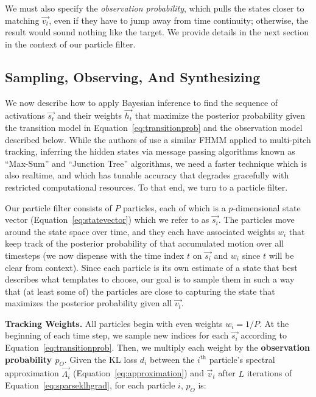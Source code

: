 \documentclass{article}
\begin{document}
    We must also specify the {\em observation probability}, which pulls the states closer to matching $\vec{v_t}$, even if they have to jump away from time continuity; otherwise, the result would sound nothing like the target. We provide details in the next section in the context of our particle filter.



\subsection{Sampling, Observing, And Synthesizing}
\label{sec:sampling}

We now describe how to apply Bayesian inference to find the sequence of activations $\vec{s_t}$ and their weights $\vec{h_t}$ that maximize the posterior probability given the transition model in Equation~\ref{eq:transitionprob} and the observation model described below.  While the authors of \cite{wohlmayr2010probabilistic} use a similar FHMM applied to multi-pitch tracking, inferring the hidden states via message passing algorithms known as ``Max-Sum'' \cite{kschischang2001factor} and ``Junction Tree'' \cite{jensen1996introduction} algorithms, we need a faster technique which is also realtime, and which has tunable accuracy that degrades gracefully with restricted computational resources.  To that end, we turn to a particle filter.

Our particle filter consists of $P$ particles, each of which is a $p$-dimensional state vector (Equation~\ref{eq:statevector}) which we refer to as $\vec{s_i}$.  The particles move around the state space over time, and they each have associated weights $w_i$ that keep track of the posterior probability of that accumulated motion over all timesteps (we now dispense with the time index $t$ on $\vec{s_i}$ and $w_i$ since $t$ will be clear from context).  Since each particle is its own estimate of a state that best describes what templates to choose, our goal is to sample them in such a way that (at least some of) the particles are close to capturing the state that maximizes the posterior probability given all $\vec{v_t}$.

\textbf{Tracking Weights.} All particles begin with even weights $w_i = 1/P$.  At the beginning of each time step, we sample new indices for each $\vec{s_i}$ according to Equation~\ref{eq:transitionprob}.  Then, we multiply each weight by the \textbf{observation probability $p_O$}.  Given the KL loss $d_i$ between the $i^{\text{th}}$ particle's spectral approximation $\vec{\Lambda_i}$ (Equation~\ref{eq:approximation}) and $\vec{v}_t$ after $L$ iterations of Equation~\ref{eq:sparseklhgrad}, for each particle $i$, $p_O$ is:
\end{document}
